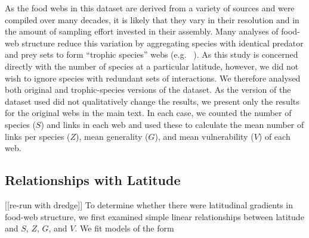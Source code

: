 \documentclass[12pt]{article}
\begin{document}


As the food webs in this dataset are derived from a variety of sources and were compiled over many decades, it
is likely that they vary in their resolution and in the amount of sampling effort invested in their assembly.
Many analyses of food-web structure reduce this variation by aggregating species with identical predator and prey
sets to form ``trophic species'' webs (e.g. ~\citep{Martinez1991,Vermaat2009,Dunne2004,Dunne2013}). As this study
is concerned directly with the number of species at a particular latitude, however, we did not wish to ignore 
species with redundant sets of interactions. We therefore analysed both original and trophic-species versions
of the dataset. As the version of the dataset used did not qualitatively change the results, we present only
the results for the original webs in the main text. In each case, we counted the number of species ($S$) and 
links in each web and used these to calculate the mean number of links per species ($Z$), mean generality 
($G$), and mean vulnerability ($V$) of each web. 


\subsection*{Relationships with Latitude}

[[re-run with dredge]]
To determine whether there were latitudinal gradients in food-web structure,
we first examined simple linear relationships between latitude and $S$, $Z$, $G$, and $V$. 
We fit models of the form
\end{document}
